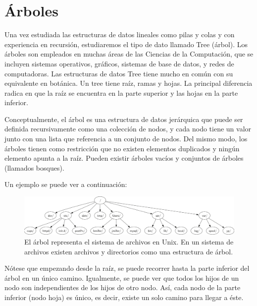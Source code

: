 \newpage
\part{Árboles}
\setcounter{section}{0}

Una vez estudiada las estructuras de datos lineales como pilas y colas y con experiencia en recursión, estudiaremos el tipo de dato llamado Tree (árbol). Los árboles son empleados en muchas áreas de las Ciencias de la Computación, que se incluyen sistemas operativos, gráficos, sistemas de base de datos, y redes de computadoras. Las estructuras de datos Tree tiene mucho en común con su equivalente en botánica. Un tree tiene raíz, ramas y hojas. La principal diferencia radica en que la raíz se encuentra en la parte superior y las hojas en la parte inferior.

Conceptualmente, el árbol es una estructura de datos jerárquica que puede ser definida recursivamente como una colección de nodos, y cada nodo tiene un valor junto con una lista que referencia a un conjunto de nodos. Del mismo modo, los árboles tienen como restricción que no existen elementos duplicados y ningún elemento apunta a la raíz. Pueden existir árboles vacíos y conjuntos de árboles (llamados bosques).

Un ejemplo se puede ver a continuación:

\begin{figure}[htpb!]
  \begin{center}
    \includegraphics[width=1.0\textwidth]{images/extree1.png}
  \end{center}
  \caption{El árbol representa el sistema de archivos en Unix. En un sistema de archivos existen archivos y directorios como una estructura de árbol.}
  \label{fig:extree1}
\end{figure}

Nótese que empezando desde la raíz, se puede recorrer hasta la parte inferior del árbol en un único camino. Igualmente, se puede ver que todos los hijos de un nodo son independientes de los hijos de otro nodo. Así, cada nodo de la parte inferior (nodo hoja) es único, es decir, existe un solo camino para llegar a éste.

